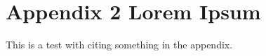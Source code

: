 
%

\chapter{Appendix 2 Lorem Ipsum}
\label{app:lorem_ipsum2}

This is a test with citing something in the appendix.

\lipsum[1-5]

